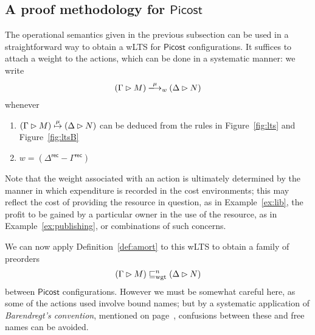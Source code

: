 \documentclass{LMCS}
\newcommand{\pfn}[1]{\mathsf{#1}}  \newcommand{\cfn}[1]{\mathsf{#1}}  \newcommand{\ownfnt}[1]{{\mathsf{#1}}}
\newcommand{\picost}{\ensuremath{\pfn{Picost}}\xspace}
\newcommand{\with}{\mathbin \rhd}
\newcommand{\record}{{\scriptstyle \mathsf{rec}}}
\newcommand{\amort}[1]{\mathrel{\sqsubseteq_{\rm wgt}^{#1}}}
\newcommand{\ar}[1]{\mathbin{\xlongrightarrow{ #1}}}
\begin{document}
\subsection{A proof methodology for  \picost}\label{sec:examples}

The operational semantics  given in the previous subsection 
can be used in a straightforward way to obtain a wLTS for \picost 
configurations. It suffices to attach a weight to the actions, which
can be done in a systematic manner: we write 
\begin{align*}
  (\Gamma \with M) \ar{\mu}_w (\Delta \with N)
\end{align*}
whenever 
\begin{enumerate}[$\bullet$]
\item $(\Gamma \with M) \newar{\mu} (\Delta \with N)$ can be deduced
from the rules in Figure~\ref{fig:lts} and Figure~\ref{fig:ltsB}

\item $w = (\Delta^\record - \Gamma^\record)$
\end{enumerate}
Note that the weight associated with an action is ultimately determined by the manner
in which expenditure is recorded in the cost environments; this may reflect the cost of
providing the resource in question, as in Example~\ref{ex:lib}, the profit to be gained
by a particular owner in the use of the resource, as in Example~\ref{ex:publishing}, or 
combinations of such concerns.  

We can now apply Definition~\ref{def:amort} to this wLTS  to obtain 
a family of preorders
\begin{align}\label{eq:amort.picost}
  (\Gamma \with M) \amort{n} (\Delta \with N)
\end{align}
between \picost configurations. However we must be somewhat careful here, as some of
the actions used involve bound names; but by a systematic application of \emph{Barendregt's
convention}, mentioned on page~\pageref{barendregt}, confusions between these and free names
can be avoided.
\end{document}
